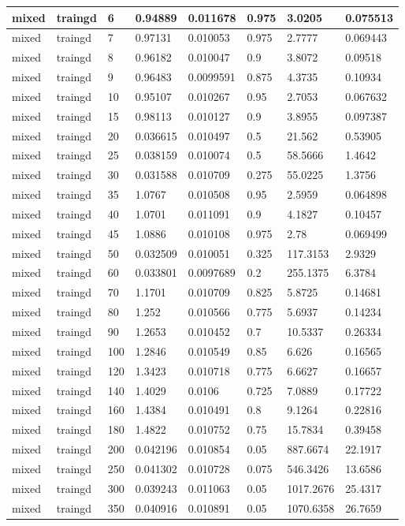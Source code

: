 \begin{longtable}{llllllll}
mixed & traingd & 6 & 0.94889 & 0.011678 & 0.975 & 3.0205 & 0.075513 \\ \hline 
mixed & traingd & 7 & 0.97131 & 0.010053 & 0.975 & 2.7777 & 0.069443 \\ \hline 
mixed & traingd & 8 & 0.96182 & 0.010047 & 0.9 & 3.8072 & 0.09518 \\ \hline 
mixed & traingd & 9 & 0.96483 & 0.0099591 & 0.875 & 4.3735 & 0.10934 \\ \hline 
mixed & traingd & 10 & 0.95107 & 0.010267 & 0.95 & 2.7053 & 0.067632 \\ \hline 
mixed & traingd & 15 & 0.98113 & 0.010127 & 0.9 & 3.8955 & 0.097387 \\ \hline 
mixed & traingd & 20 & 0.036615 & 0.010497 & 0.5 & 21.562 & 0.53905 \\ \hline 
mixed & traingd & 25 & 0.038159 & 0.010074 & 0.5 & 58.5666 & 1.4642 \\ \hline 
mixed & traingd & 30 & 0.031588 & 0.010709 & 0.275 & 55.0225 & 1.3756 \\ \hline 
mixed & traingd & 35 & 1.0767 & 0.010508 & 0.95 & 2.5959 & 0.064898 \\ \hline 
mixed & traingd & 40 & 1.0701 & 0.011091 & 0.9 & 4.1827 & 0.10457 \\ \hline 
mixed & traingd & 45 & 1.0886 & 0.010108 & 0.975 & 2.78 & 0.069499 \\ \hline 
mixed & traingd & 50 & 0.032509 & 0.010051 & 0.325 & 117.3153 & 2.9329 \\ \hline 
mixed & traingd & 60 & 0.033801 & 0.0097689 & 0.2 & 255.1375 & 6.3784 \\ \hline 
mixed & traingd & 70 & 1.1701 & 0.010709 & 0.825 & 5.8725 & 0.14681 \\ \hline 
mixed & traingd & 80 & 1.252 & 0.010566 & 0.775 & 5.6937 & 0.14234 \\ \hline 
mixed & traingd & 90 & 1.2653 & 0.010452 & 0.7 & 10.5337 & 0.26334 \\ \hline 
mixed & traingd & 100 & 1.2846 & 0.010549 & 0.85 & 6.626 & 0.16565 \\ \hline 
mixed & traingd & 120 & 1.3423 & 0.010718 & 0.775 & 6.6627 & 0.16657 \\ \hline 
mixed & traingd & 140 & 1.4029 & 0.0106 & 0.725 & 7.0889 & 0.17722 \\ \hline 
mixed & traingd & 160 & 1.4384 & 0.010491 & 0.8 & 9.1264 & 0.22816 \\ \hline 
mixed & traingd & 180 & 1.4822 & 0.010752 & 0.75 & 15.7834 & 0.39458 \\ \hline 
mixed & traingd & 200 & 0.042196 & 0.010854 & 0.05 & 887.6674 & 22.1917 \\ \hline 
mixed & traingd & 250 & 0.041302 & 0.010728 & 0.075 & 546.3426 & 13.6586 \\ \hline 
mixed & traingd & 300 & 0.039243 & 0.011063 & 0.05 & 1017.2676 & 25.4317 \\ \hline 
mixed & traingd & 350 & 0.040916 & 0.010891 & 0.05 & 1070.6358 & 26.7659 \\ \hline 
\end{longtable}
